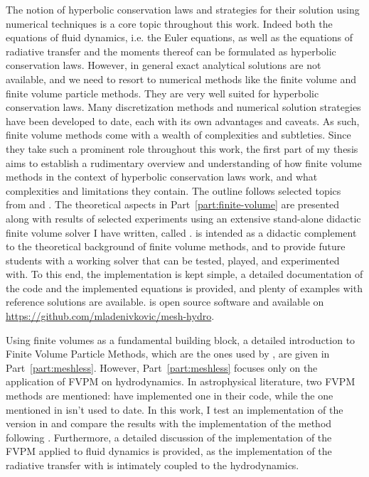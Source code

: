 The notion of hyperbolic conservation laws and strategies for their solution using numerical
techniques is a core topic throughout this work. Indeed both the equations of fluid dynamics, i.e.
the Euler equations, as well as the equations of radiative transfer and the moments thereof can be
formulated as hyperbolic conservation laws. However, in general exact analytical solutions are not
available, and we need to resort to numerical methods like the finite volume and finite volume
particle methods. They are very well suited for hyperbolic conservation laws. Many discretization
methods and numerical solution strategies have been developed to date, each with its own advantages
and caveats. As such, finite volume methods come with a wealth of complexities and subtleties. Since
they take such a prominent role throughout this work, the first part of my thesis aims to establish
a rudimentary overview and understanding of how finite volume methods in the context of hyperbolic
conservation laws work, and what complexities and limitations they contain. The outline follows
selected topics from \citet{toroRiemannSolversNumerical2009} and
\citet{levequeFiniteVolumeMethods2002}. The theoretical aspects in Part~\ref{part:finite-volume}
are presented along with results of selected experiments using an extensive stand-alone didactic
finite volume solver I have written, called \meshhydro. \meshhydro is intended as a didactic
complement to the theoretical background of finite volume methods, and to provide future students
with a working solver that can be tested, played, and experimented with. To this end, the
implementation is kept simple, a detailed documentation of the code and the implemented equations is
provided, and plenty of examples with reference solutions are available. \meshhydro is open source
software and available on \url{https://github.com/mladenivkovic/mesh-hydro}.

Using finite volumes as a fundamental building block, a detailed introduction to Finite Volume
Particle Methods, which are the ones used by \GEARRT, are given in Part~\ref{part:meshless}.
However, Part~\ref{part:meshless} focuses only on the application of FVPM on hydrodynamics. In
astrophysical literature, two FVPM methods are mentioned: \cite{hopkinsGIZMONewClass2015} have
implemented one in their  code, while the one mentioned in
\cite{ivanovaCommonEnvelopeEvolution2013} isn't used to date. In this work, I test an
implementation of the \cite{ivanovaCommonEnvelopeEvolution2013} version in \swift and compare the
results with the implementation of the method following \cite{hopkinsGIZMONewClass2015}.
Furthermore, a detailed discussion of the implementation of the FVPM applied to fluid dynamics is
provided, as the implementation of the radiative transfer with \GEARRT is intimately coupled to the
hydrodynamics.

